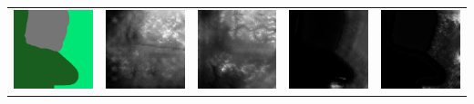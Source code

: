 \documentclass[twocolumn]{article}
\begin{document}
\begin{table}[t]
\begin{tabular}{c|c|c|c|c}
 				\includegraphics[width=0.25\columnwidth]{30.png} & \includegraphics[width=0.25\columnwidth]{31.png} & \includegraphics[width=0.25\columnwidth]{32.png} & \includegraphics[width=0.25\columnwidth]{33.png} & \includegraphics[width=0.25\columnwidth]{34.png} \\

\end{tabular}
\end{table}
\end{document}
